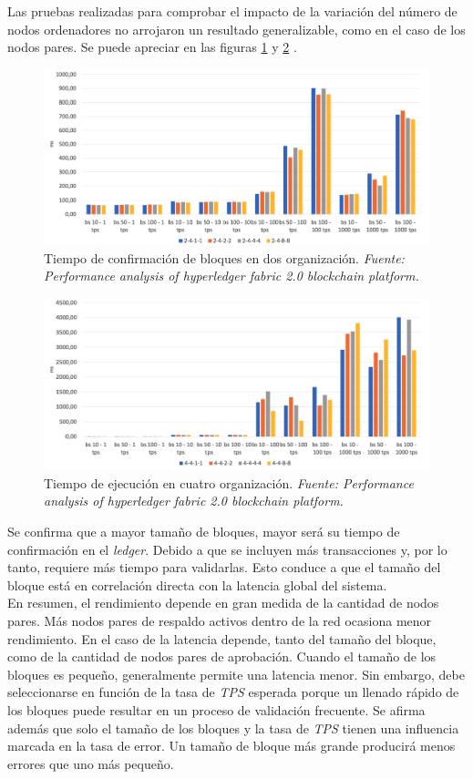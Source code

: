 Las pruebas realizadas para comprobar el impacto de la variaci\'on del n\'umero de nodos ordenadores no arrojaron un resultado generalizable, como en el caso de los nodos pares. Se puede apreciar en las figuras \ref{BlockCommitOrderes} y \ref{EscalaOrderesCuatroOrganizacion} .\\

\begin{figure}[h]
\centering
\includegraphics[width=0.6\linewidth]{Graphics/BlockCommitOrderes.png}
\caption{Tiempo de confirmaci\'on de bloques en dos organizaci\'on. \emph{Fuente: Performance analysis of hyperledger fabric 2.0 blockchain platform.}}
\label{BlockCommitOrderes}
\end{figure}

\begin{figure}[h]
\centering
\includegraphics[width=0.6\linewidth]{Graphics/EscalaOrderesCuatroOrganizaciones.png}
\caption{Tiempo de ejecuci\'on en cuatro organizaci\'on. \emph{Fuente: Performance analysis of hyperledger fabric 2.0 blockchain platform.}}
\label{EscalaOrderesCuatroOrganizacion}
\end{figure}

Se confirma que a mayor tama\~no de bloques, mayor ser\'a su tiempo de confirmaci\'on en el \emph{ledger}. Debido a que se incluyen m\'as transacciones y, por lo tanto, requiere m\'as tiempo para validarlas. Esto conduce a que el tama\~no del bloque est\'a en correlaci\'on directa con la latencia global del sistema.\\

En resumen, el rendimiento depende en gran medida de la cantidad de nodos pares. M\'as nodos pares de respaldo activos dentro de la red ocasiona menor rendimiento. En el caso de la latencia depende, tanto del tama\~no del bloque, como de la cantidad de nodos pares de aprobaci\'on. Cuando el tama\~no de los bloques es peque\~no, generalmente permite una latencia menor. Sin embargo, debe seleccionarse en funci\'on de la tasa de \emph{TPS} esperada porque un llenado r\'apido de los bloques puede resultar en un proceso de validaci\'on frecuente. Se afirma adem\'as que solo el tama\~no de los bloques y la tasa de \emph{TPS} tienen una influencia marcada en la tasa de error. Un tama\~no de bloque m\'as grande producir\'a menos errores que uno m\'as peque\~no.
